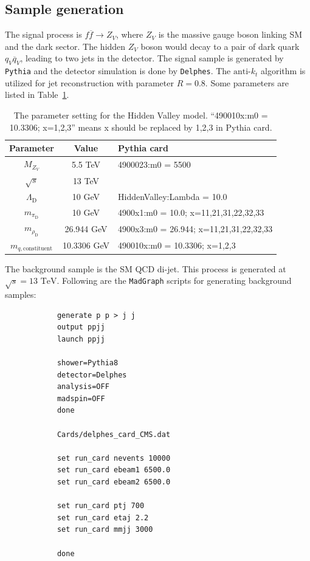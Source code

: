 \documentclass[12pt]{article}
\begin{document}
    \subsection{Sample generation}%
    \label{sub:sample_generation}
        The signal process is $f \overline{f} \to Z_V$, where $Z_V$ is the massive gauge boson linking SM and the dark sector. The hidden $Z_V$ boson would decay to a pair of dark quark $q_V \overline{q}_V$, leading to two jets in the detector. The signal sample is generated by \verb|Pythia| and the detector simulation is done by \verb|Delphes|. The $\text{anti-}k_t$ algorithm is utilized for jet reconstruction with parameter $R = 0.8$. Some parameters are listed in Table~\ref{tab:hv_model_signal_parameter}.

        \begin{table}[htpb]
            \centering
            \caption{The parameter setting for the Hidden Valley model. ``490010x:m0 = 10.3306; x=1,2,3'' means x should be replaced by 1,2,3 in Pythia card.}
            \label{tab:hv_model_signal_parameter}
            \begin{tabular}{c|c|l}
                Parameter                  & Value       & Pythia card                             \\ \hline
                $M_{Z_V}$                  & 5.5 TeV     & 4900023:m0 = 5500                       \\
                $\sqrt{s}$                 & 13 TeV      &                                         \\
                $\Lambda_{\text{D}}$       & 10 GeV      & HiddenValley:Lambda = 10.0              \\
                $m_{\pi_{\text{D}}}$       & 10 GeV      & 4900x1:m0 = 10.0; x=11,21,31,22,32,33   \\
                $m_{\rho_{\text{D}}}$      & 26.944 GeV  & 4900x3:m0 = 26.944; x=11,21,31,22,32,33 \\
                $m_{q,\text{constituent}}$ & 10.3306 GeV & 490010x:m0 = 10.3306; x=1,2,3
            \end{tabular}
        \end{table}

        The background sample is the SM QCD di-jet. This process is generated at $\sqrt{s} = \text{13 TeV}$. Following are the \verb|MadGraph| scripts for generating background samples:
        \begin{verbatim}
            generate p p > j j
            output ppjj
            launch ppjj

            shower=Pythia8
            detector=Delphes
            analysis=OFF
            madspin=OFF
            done

            Cards/delphes_card_CMS.dat

            set run_card nevents 10000
            set run_card ebeam1 6500.0
            set run_card ebeam2 6500.0

            set run_card ptj 700
            set run_card etaj 2.2
            set run_card mmjj 3000

            done
        \end{verbatim}
\end{document}
